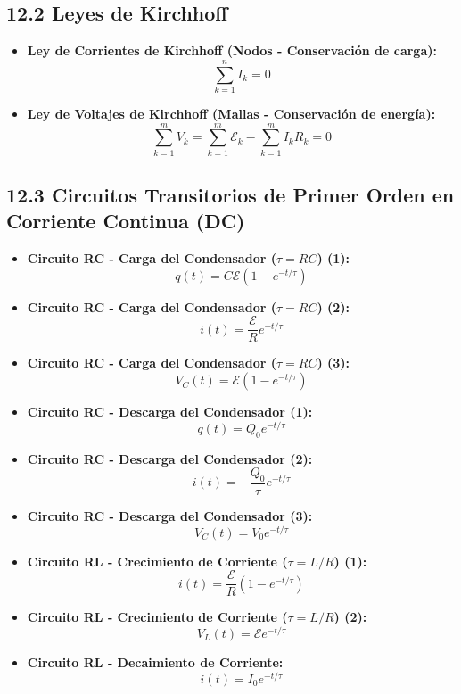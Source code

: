 \documentclass[11pt,a4paper]{article}
\begin{document}
\subsection*{12.2 Leyes de Kirchhoff}

\begin{itemize}
  \item \textbf{Ley de Corrientes de Kirchhoff (Nodos - Conservación de carga):}
  \[
    \sum_{k=1}^n I_k = 0
  \]
  \item \textbf{Ley de Voltajes de Kirchhoff (Mallas - Conservación de energía):}
  \[
    \sum_{k=1}^m V_k = \sum_{k=1}^m \mathcal{E}_k - \sum_{k=1}^m I_k R_k = 0
  \]
\end{itemize}

\subsection*{12.3 Circuitos Transitorios de Primer Orden en Corriente Continua (DC)}

\begin{itemize}
  \item \textbf{Circuito RC - Carga del Condensador ($\tau = RC$) (1):}
  \[
    q(t) = C\mathcal{E} (1 - e^{-t/\tau})
  \]
  \item \textbf{Circuito RC - Carga del Condensador ($\tau = RC$) (2):}
  \[
    i(t) = \frac{\mathcal{E}}{R} e^{-t/\tau}
  \]
  \item \textbf{Circuito RC - Carga del Condensador ($\tau = RC$) (3):}
  \[
    V_C(t) = \mathcal{E}(1 - e^{-t/\tau})
  \]
  \item \textbf{Circuito RC - Descarga del Condensador (1):}
  \[
    q(t) = Q_0 e^{-t/\tau}
  \]
  \item \textbf{Circuito RC - Descarga del Condensador (2):}
  \[
    i(t) = -\frac{Q_0}{\tau} e^{-t/\tau}
  \]
  \item \textbf{Circuito RC - Descarga del Condensador (3):}
  \[
    V_C(t) = V_0 e^{-t/\tau}
  \]
  \item \textbf{Circuito RL - Crecimiento de Corriente ($\tau = L/R$) (1):}
  \[
    i(t) = \frac{\mathcal{E}}{R} (1 - e^{-t/\tau})
  \]
  \item \textbf{Circuito RL - Crecimiento de Corriente ($\tau = L/R$) (2):}
  \[
    V_L(t) = \mathcal{E} e^{-t/\tau}
  \]
  \item \textbf{Circuito RL - Decaimiento de Corriente:}
  \[
    i(t) = I_0 e^{-t/\tau}
  \]
\end{itemize}
\end{document}
